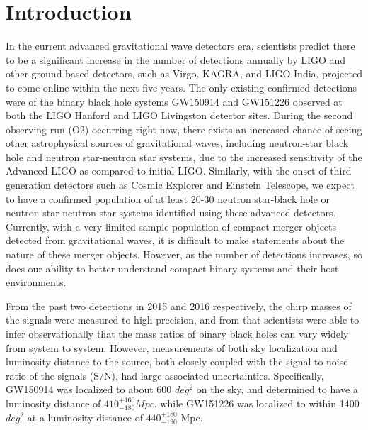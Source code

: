 \documentclass{article}
\begin{document}
\section{Introduction}

In the current advanced gravitational wave detectors era, scientists predict there to be a significant increase in the number of detections annually by LIGO and other ground-based detectors, such as Virgo, KAGRA, and LIGO-India, projected to come online within the next five years.  The only existing confirmed detections were of the binary black hole systems GW150914 and GW151226 observed at both the LIGO Hanford and LIGO Livingston detector sites.  During the second observing run (O2) occurring right now, there exists an increased chance of seeing other astrophysical sources of gravitational waves, including neutron-star black hole and neutron star-neutron star systems, due to the increased sensitivity of the Advanced LIGO as compared to initial LIGO.  Similarly, with the onset of third generation detectors such as Cosmic Explorer and Einstein Telescope, we expect to have a confirmed population of at least 20-30 neutron star-black hole or neutron star-neutron star systems identified using these advanced detectors.  Currently, with a very limited sample population of compact merger objects detected from gravitational waves, it is difficult to make statements about the nature of these merger objects.  However, as the number of detections increases, so does our ability to better understand compact binary systems and their host environments.

From the past two detections in 2015 and 2016 respectively, the chirp masses of the signals were measured to high precision, and from that scientists were able to infer observationally that the mass ratios of binary black holes can vary widely from system to system.  However, measurements of both sky localization and luminosity distance to the source, both closely coupled with the signal-to-noise ratio of the signals (S/N), had large associated uncertainties.  Specifically, GW150914 was localized to about 600 $deg^2$ on the sky, and determined to have a luminosity distance of $410^{+160}_{-180} Mpc$, while GW151226 was localized to within 1400 $deg^{2}$ at a luminosity distance of $440^{+180}_{-190}$ Mpc.  
 
\end{document}
